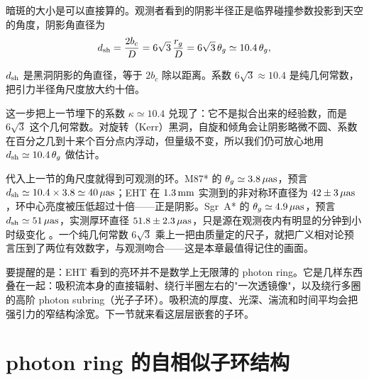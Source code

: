 暗斑的大小是可以直接算的。观测者看到的阴影半径正是临界碰撞参数投影到天空的角度，阴影角直径为
\begin{equation}
  d_{\rm sh}=\frac{2b_c}{D}=6\sqrt{3}\,\frac{r_g}{D}=6\sqrt{3}\,\theta_g\simeq10.4\,\theta_g,
  \label{eq:e19-shadow}
\end{equation}
\begin{formulaexplain}
\(d_{\rm sh}\) 是黑洞阴影的角直径，等于 \(2b_c\) 除以距离。系数 \(6\sqrt3\approx10.4\) 是纯几何常数，把引力半径角尺度放大约十倍。
\end{formulaexplain}
这一步把上一节埋下的系数 \(\kappa\simeq10.4\) 兑现了：它不是拟合出来的经验数，而是 \(6\sqrt3\) 这个几何常数。对旋转（Kerr）黑洞，自旋和倾角会让阴影略微不圆、系数在百分之几到十来个百分点内浮动，但量级不变，所以我们仍可放心地用 \(d_{\rm sh}\simeq10.4\,\theta_g\) 做估计。

代入上一节的角尺度就得到可观测的环。M87* 的 \(\theta_g\simeq3.8\,\mu{\rm as}\)，预言 \(d_{\rm sh}\simeq10.4\times3.8\simeq40\,\mu{\rm as}\)；EHT 在 \(1.3\,{\rm mm}\) 实测到的非对称环直径为 \(42\pm3\,\mu{\rm as}\)，环中心亮度被压低超过十倍——正是阴影。Sgr~A* 的 \(\theta_g\simeq4.9\,\mu{\rm as}\)，预言 \(d_{\rm sh}\simeq51\,\mu{\rm as}\)，实测厚环直径 \(51.8\pm2.3\,\mu{\rm as}\)，只是源在观测夜内有明显的分钟到小时级变化 \citep{2019ApJ...875L...4E,2019ApJ...875L...5E,2022ApJ...930L..14E,2022ApJ...930L..15E}。一个纯几何常数 \(6\sqrt3\) 乘上一把由质量定的尺子，就把广义相对论预言压到了两位有效数字，与观测吻合——这是本章最值得记住的画面。

要提醒的是：EHT 看到的亮环并不是数学上无限薄的 photon ring。它是几样东西叠在一起：吸积流本身的直接辐射、绕行半圈左右的"一次透镜像"，以及绕行多圈的高阶 photon subring（光子子环）。吸积流的厚度、光深、湍流和时间平均会把强引力的窄结构涂宽。下一节就来看这层层嵌套的子环。

\section{photon ring 的自相似子环结构}
\label{sec:e19-subring}

